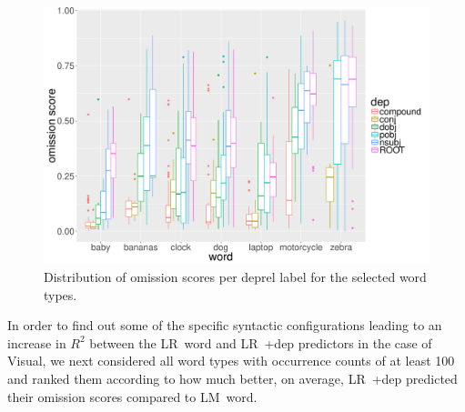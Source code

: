 \begin{figure}[t]
  \centering
  \includegraphics[scale=0.35]{top_words.pdf}
  \caption{Distribution of omission scores per deprel label for the selected word types.}
  \label{fig:top_words}
\end{figure}

In order to find out some of the specific syntactic configurations leading to
an increase in $R^2$ between the {\sc LR~word} and {\sc LR~+dep} predictors
in the case of {\sc Visual}, we next considered all word types with
occurrence counts of at least 100 and ranked them according to how much
better, on average, {\sc LR~+dep} predicted their omission scores 
compared to {\sc LM~word}. 

